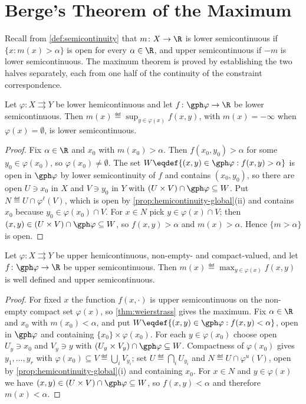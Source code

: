 \section{Berge's Theorem of the Maximum}\label{sec:berge}

Recall from \autoref{def:semicontinuity} that $m\colon X\to\R$ is lower
semicontinuous if $\{x : m(x)>\alpha\}$ is open for every $\alpha\in\R$, and
upper semicontinuous if $-m$ is lower semicontinuous. The maximum theorem is
proved by establishing the two halves separately, each from one half of the
continuity of the constraint correspondence.

\begin{lemma}\label{lem:berge-lsc}
	Let $\varphi\colon X\rightrightarrows Y$ be lower hemicontinuous and let
	$f\colon\gph\varphi\to\R$ be lower semicontinuous. Then
	$m(x)\eqdef\sup_{y\in\varphi(x)}f(x,y)$, with $m(x)=-\infty$ when
	$\varphi(x)=\emptyset$, is lower semicontinuous.
\end{lemma}

\begin{proof}
	Fix $\alpha\in\R$ and $x_0$ with $m(x_0)>\alpha$. Then $f(x_0,y_0)>\alpha$ for
	some $y_0\in\varphi(x_0)$, so $\varphi(x_0)\neq\emptyset$. The set
	$W\eqdef\{(x,y)\in\gph\varphi : f(x,y)>\alpha\}$ is open in $\gph\varphi$ by
	lower semicontinuity of $f$ and contains $(x_0,y_0)$, so there are open
	$U\ni x_0$ in $X$ and $V\ni y_0$ in $Y$ with
	$(U\times V)\cap\gph\varphi\subseteq W$. Put
	$N\eqdef U\cap\varphi^{\ell}(V)$, which is open by
	\autoref{prop:hemicontinuity-global}(ii) and contains $x_0$ because
	$y_0\in\varphi(x_0)\cap V$. For $x\in N$ pick $y\in\varphi(x)\cap V$; then
	$(x,y)\in(U\times V)\cap\gph\varphi\subseteq W$, so $f(x,y)>\alpha$ and
	$m(x)>\alpha$. Hence $\{m>\alpha\}$ is open.
\end{proof}

\begin{lemma}\label{lem:berge-usc}
	Let $\varphi\colon X\rightrightarrows Y$ be upper hemicontinuous, non-empty- and
	compact-valued, and let $f\colon\gph\varphi\to\R$ be upper semicontinuous. Then
	$m(x)\eqdef\max_{y\in\varphi(x)}f(x,y)$ is well defined and upper
	semicontinuous.
\end{lemma}

\begin{proof}
	For fixed $x$ the function $f(x,\cdot)$ is upper semicontinuous on the
	non-empty compact set $\varphi(x)$, so \autoref{thm:weierstrass} gives the
	maximum. Fix $\alpha\in\R$ and $x_0$ with $m(x_0)<\alpha$, and put
	$W\eqdef\{(x,y)\in\gph\varphi : f(x,y)<\alpha\}$, open in $\gph\varphi$ and
	containing $\{x_0\}\times\varphi(x_0)$. For each $y\in\varphi(x_0)$ choose open
	$U_y\ni x_0$ and $V_y\ni y$ with $(U_y\times V_y)\cap\gph\varphi\subseteq W$.
	Compactness of $\varphi(x_0)$ gives $y_1,\dots,y_r$ with
	$\varphi(x_0)\subseteq V\eqdef\bigcup_{i}V_{y_i}$; set
	$U\eqdef\bigcap_{i}U_{y_i}$ and $N\eqdef U\cap\varphi^{u}(V)$, open by
	\autoref{prop:hemicontinuity-global}(i) and containing $x_0$. For $x\in N$ and
	$y\in\varphi(x)$ we have $(x,y)\in(U\times V)\cap\gph\varphi\subseteq W$, so
	$f(x,y)<\alpha$ and therefore $m(x)<\alpha$.
\end{proof}

